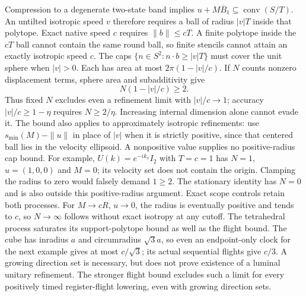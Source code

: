 Compression to a degenerate two-state band implies
$u+M\overline B_1\subseteq\operatorname{conv}(S/T)$.
An untilted isotropic speed $v$ therefore requires a ball of radius $|v|T$
inside that polytope. Exact native speed $c$ requires $\|b\|\leq cT$.
A finite polytope inside the $cT$ ball cannot contain the same round ball,
so finite stencils cannot attain an exactly isotropic speed $c$.
The caps $\{n\in S^2:n\cdot b\geq |v|T\}$ must cover the
unit sphere when $|v|>0$. Each has area at most $2\pi(1-|v|/c)$. If $N$ counts nonzero
displacement terms, sphere area and subadditivity give
\[
 N(1-|v|/c)\geq2.
 \tag{QT1c}
\]
Thus fixed $N$ excludes even a refinement limit with $|v|/c\to1$;
accuracy $|v|/c\geq1-\eta$ requires $N\geq2/\eta$.
Increasing internal dimension alone cannot evade it. The bound also
applies to approximately isotropic refinements: use
$s_{\min}(M)-\|u\|$ in place of $|v|$ when it is strictly positive,
since that centered ball lies in the velocity ellipsoid. A nonpositive
value supplies no positive-radius cap bound. For example,
$U(k)=e^{-ik_x}I_2$ with $T=c=1$ has $N=1$, $u=(1,0,0)$ and $M=0$;
its velocity set does not contain the origin. Clamping the radius to zero
would falsely demand $1\geq2$. The stationary identity has $N=0$ and
is also outside this positive-radius argument. Exact scope controls retain
both processes. For $M\to cR$, $u\to0$, the radius is eventually positive
and tends to $c$, so $N\to\infty$ follows without exact isotropy
at any cutoff. The tetrahedral
process saturates its support-polytope bound as well as the flight bound.
The cube has inradius $a$ and circumradius $\sqrt3a$, so even an
endpoint-only clock for the next example gives at most $c/\sqrt3$;
its actual sequential flights give $c/3$. A growing direction set is
necessary, but does not prove existence of a luminal unitary refinement.
The stronger flight bound excludes such a limit for every positively timed
register-flight lowering, even with growing direction sets.

